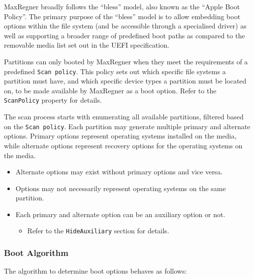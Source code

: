 \documentclass[]{article}
\makeatletter
\providecommand{\tightlist}{%
  \setlength{\itemsep}{0pt}\setlength{\parskip}{0pt}}
\renewcommand{\label}[1]{%
\zref@wrapper@immediate{\oldlabel{#1}}}  %
\makeatother
\begin{document}
MaxRegner broadly follows the ``bless'' model, also known as the ``Apple Boot Policy''. The primary purpose of
the ``bless'' model is to allow embedding boot options within the file system (and be accessible through a
specialised driver) as well as supporting a broader range of predefined boot paths as compared to the
removable media list set out in the UEFI specification.

Partitions can only booted by MaxRegner when they meet the requirements of a predefined \texttt{Scan policy}.
This policy sets out which specific file systems a partition must have, and which specific device types
a partition must be located on, to be made available by MaxRegner as a boot option.
Refer to the \texttt{ScanPolicy} property for details.

The scan process starts with enumerating all available partitions, filtered based on the \texttt{Scan policy}.
Each partition may generate multiple primary and alternate options. Primary options represent operating systems
installed on the media, while alternate options represent recovery options for the operating systems on the media.
\begin{itemize}
\tightlist
\item Alternate options may exist without primary options and vice versa.
\item Options may not necessarily represent operating systems on the same partition.
\item Each primary and alternate option can be an auxiliary option or not.
\begin{itemize}
\tightlist
  \item Refer to the \texttt{HideAuxiliary} section for details.
\end{itemize} \medskip
\end{itemize}

\subsubsection{Boot Algorithm}\label{bootalgorithm}

The algorithm to determine boot options behaves as follows:
\end{document}

